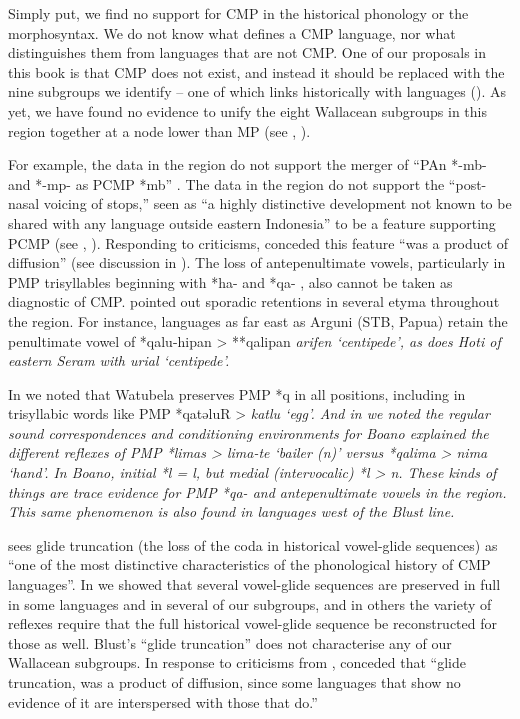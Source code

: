 Simply put,
we find no support for CMP in the historical phonology or the morphosyntax.
We do not know what defines a CMP language,
nor what distinguishes them from languages that are not CMP.
One of our proposals in this book is that CMP does not exist,
and instead it should be replaced with the nine subgroups we
identify -- one of which links historically with  languages ().
As yet, we have found no evidence to unify the eight Wallacean
subgroups in this region together at a node lower than MP
(see , ).

For example, the data in the region do not support the merger
of “PAn *-mb- and *-mp- as PCMP *mb” \citep[26]{Blust1981}.
The data in the region do not support the “post-nasal voicing
of stops,” seen as “a highly distinctive development not known
to be shared with any language outside eastern Indonesia” to
be a feature supporting PCMP (see \cite[94--98]{Blust2008}, \cite[72]{Blust2009}).
Responding to criticisms, \citet[72]{Blust2009} conceded this
feature “was a product of diffusion” (see discussion in ).
The loss of antepenultimate vowels,
particularly in PMP trisyllables beginning with *ha-
and *qa- \citep[263f]{Blust1993},
also cannot be taken as diagnostic of CMP.
\citet[123]{DonohueGrimes2008} pointed out sporadic retentions
in several etyma throughout the region.
For instance, languages as far east as
Arguni (STB, Papua) retain the penultimate
vowel of *qalu-hipan > **qalipan \it{arifen} `centipede',
as does Hoti of eastern Seram with \it{urial} `centipede'.

In  we noted that Watubela preserves PMP *q in
all positions, including in trisyllabic words like PMP *qatəluR > \it{katlu} ‘egg’.
And in  we noted the regular sound correspondences
and conditioning environments for Boano explained the different
reflexes of PMP *limas > lima-te ‘bailer (n)’ versus *qalima > \it{nima} ‘hand’.
In Boano, initial *l = \it{l},
but medial (intervocalic) *l > \it{n}.
These kinds of things are trace evidence for PMP *qa-
and antepenultimate vowels in the region.
This same phenomenon is also found in languages west of the Blust line.

\citet[264ff]{Blust1993} sees glide truncation (the loss of the coda
in historical vowel-glide sequences) as “one of the most distinctive
characteristics of the phonological history of CMP languages”.
In  we showed that several vowel-glide sequences
are preserved in full in some languages
and in several of our subgroups,
and in others the variety of reflexes require that the full historical
vowel-glide sequence be reconstructed for those as well.
Blust’s “glide truncation” does not characterise any of our Wallacean subgroups.
In response to criticisms from \citet{DonohueGrimes2008},
\citet[72]{Blust2009} conceded that “glide truncation,
was a product of diffusion,
since some languages that show no evidence of it are interspersed
with those that do.”

